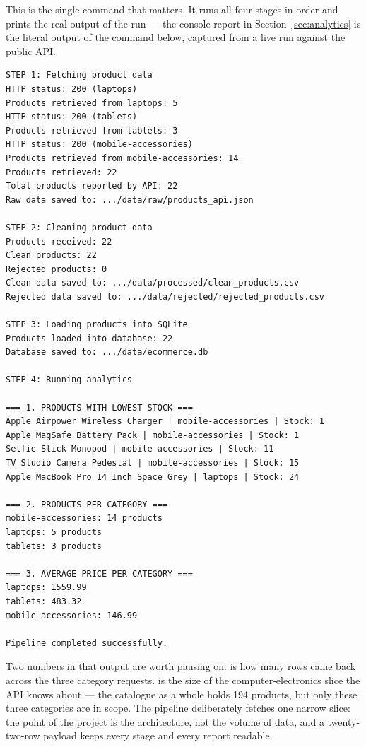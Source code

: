 This is the single command that matters. It runs all four stages in order
and prints the real output of the run --- the console report in
Section~\ref{sec:analytics} is the literal output of the command below,
captured from a live run against the public API.

\begin{codebox}
\noindent
\begin{lstlisting}[style=txt]
STEP 1: Fetching product data
HTTP status: 200 (laptops)
Products retrieved from laptops: 5
HTTP status: 200 (tablets)
Products retrieved from tablets: 3
HTTP status: 200 (mobile-accessories)
Products retrieved from mobile-accessories: 14
Products retrieved: 22
Total products reported by API: 22
Raw data saved to: .../data/raw/products_api.json

STEP 2: Cleaning product data
Products received: 22
Clean products: 22
Rejected products: 0
Clean data saved to: .../data/processed/clean_products.csv
Rejected data saved to: .../data/rejected/rejected_products.csv

STEP 3: Loading products into SQLite
Products loaded into database: 22
Database saved to: .../data/ecommerce.db

STEP 4: Running analytics

=== 1. PRODUCTS WITH LOWEST STOCK ===
Apple Airpower Wireless Charger | mobile-accessories | Stock: 1
Apple MagSafe Battery Pack | mobile-accessories | Stock: 1
Selfie Stick Monopod | mobile-accessories | Stock: 11
TV Studio Camera Pedestal | mobile-accessories | Stock: 15
Apple MacBook Pro 14 Inch Space Grey | laptops | Stock: 24

=== 2. PRODUCTS PER CATEGORY ===
mobile-accessories: 14 products
laptops: 5 products
tablets: 3 products

=== 3. AVERAGE PRICE PER CATEGORY ===
laptops: 1559.99
tablets: 483.32
mobile-accessories: 146.99

Pipeline completed successfully.
\end{lstlisting}
\end{codebox}

Two numbers in that output are worth pausing on.
 is how many rows came back across the three
category requests.  is the size
of the computer-electronics slice the API knows about --- the catalogue as a
whole holds 194 products, but only these three categories are in scope. The
pipeline deliberately fetches one narrow slice: the point of the project is
the architecture, not the volume of data, and a twenty-two-row payload keeps
every stage and every report readable.

